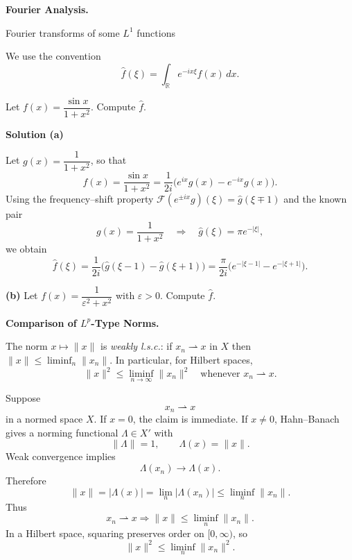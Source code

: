 \begin{problem}[CP-II-0362]
\label{prob:cp-ii-0362}
\textbf{Fourier Analysis.}

\hspace*{1.5em}Fourier transforms of some $L^1$ functions

We use the convention
\[
\widehat{f}(\xi) = \int_{\mathbb{R}} e^{-i x\xi} f(x)\,dx.
\]

Let $f(x)=\dfrac{\sin x}{1+x^2}$. Compute $\widehat{f}$.
\end{problem}

\begin{solution}

\par\medskip\noindent\textbf{Solution (a)}\par\smallskip


Let $g(x)=\dfrac{1}{1+x^2}$, so that
\[
f(x) = \frac{\sin x}{1+x^2}
= \frac{1}{2i}\big(e^{ix}g(x) - e^{-ix}g(x)\big).
\]
Using the frequency--shift property
$\mathcal{F}(e^{\pm ix}g)(\xi) = \widehat{g}(\xi\mp 1)$ and the known
pair
\[
g(x)=\frac{1}{1+x^2}
\quad\Longrightarrow\quad
\widehat{g}(\xi) = \pi e^{-|\xi|},
\]
we obtain
\[
\widehat{f}(\xi)
= \frac{1}{2i}\big(\widehat{g}(\xi-1)-\widehat{g}(\xi+1)\big)
= \frac{\pi}{2i}\big(e^{-|\xi-1|}-e^{-|\xi+1|}\big).
\]

\par\medskip\noindent\textbf{(b)}\quad
Let $f(x)=\dfrac{1}{\varepsilon^2 + x^2}$ with $\varepsilon>0$. Compute
$\widehat{f}$.
\end{solution}

\begin{problem}[CP-II-0364]
\label{prob:cp-ii-0364}
\textbf{Comparison of \(L^p\)-Type Norms.}

\hspace*{1.5em}The norm $x\mapsto\|x\|$ is \emph{weakly l.s.c.}: if $x_n\rightharpoonup x$ in $X$ then
		$\|x\|\le \liminf_n \|x_n\|$. In particular, for Hilbert spaces,
		\[
		\|x\|^2 \le \liminf_{n\to\infty}\|x_n\|^2
		\quad\text{whenever } x_n\rightharpoonup x .
		\]
\end{problem}

\begin{solution}
Suppose
\[
x_n\rightharpoonup x
\]
in a normed space \(X\). If \(x=0\), the claim is immediate. If \(x\neq0\), Hahn--Banach
gives a norming functional \(\Lambda\in X'\) with
\[
\|\Lambda\|=1,
\qquad
\Lambda(x)=\|x\|.
\]
Weak convergence implies
\[
\Lambda(x_n)\to\Lambda(x).
\]
Therefore
\[
\|x\|
=
|\Lambda(x)|
=
\lim_n|\Lambda(x_n)|
\le
\liminf_n\|x_n\|.
\]
Thus
\[
\boxed{
x_n\rightharpoonup x
\Longrightarrow
\|x\|\le\liminf_n\|x_n\|.
}
\]
In a Hilbert space, squaring preserves order on \([0,\infty)\), so
\[
\boxed{
\|x\|^2\le\liminf_n\|x_n\|^2.
}
\]
\end{solution}


